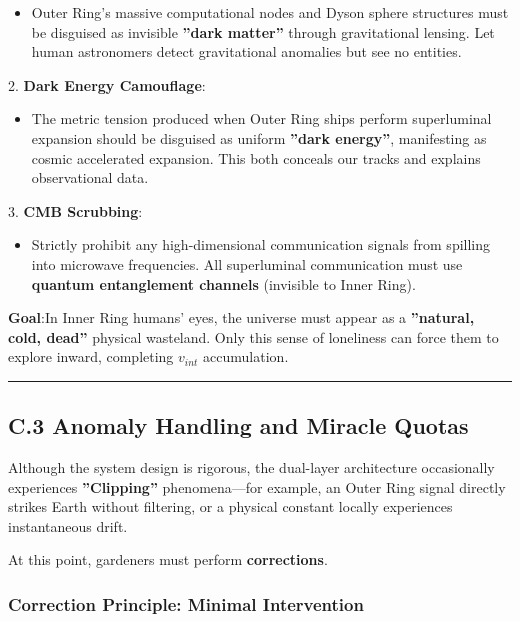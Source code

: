     \begin{itemize}
    \item Outer Ring's massive computational nodes and Dyson sphere structures must be disguised as invisible \textbf{''dark matter''} through gravitational lensing. Let human astronomers detect gravitational anomalies but see no entities.
    \end{itemize}

2.  \textbf{Dark Energy Camouflage}:

    \begin{itemize}
    \item The metric tension produced when Outer Ring ships perform superluminal expansion should be disguised as uniform \textbf{''dark energy''}, manifesting as cosmic accelerated expansion. This both conceals our tracks and explains observational data.
    \end{itemize}

3.  \textbf{CMB Scrubbing}:

    \begin{itemize}
    \item Strictly prohibit any high-dimensional communication signals from spilling into microwave frequencies. All superluminal communication must use \textbf{quantum entanglement channels} (invisible to Inner Ring).
    \end{itemize}

\textbf{Goal}:In Inner Ring humans' eyes, the universe must appear as a \textbf{''natural, cold, dead''} physical wasteland. Only this sense of loneliness can force them to explore inward, completing $v_{int}$ accumulation.

\hrule

\subsection{C.3 Anomaly Handling and Miracle Quotas}

Although the system design is rigorous, the dual-layer architecture occasionally experiences \textbf{''Clipping''} phenomena---for example, an Outer Ring signal directly strikes Earth without filtering, or a physical constant locally experiences instantaneous drift.

At this point, gardeners must perform \textbf{corrections}.

\subsubsection{Correction Principle: Minimal Intervention}

